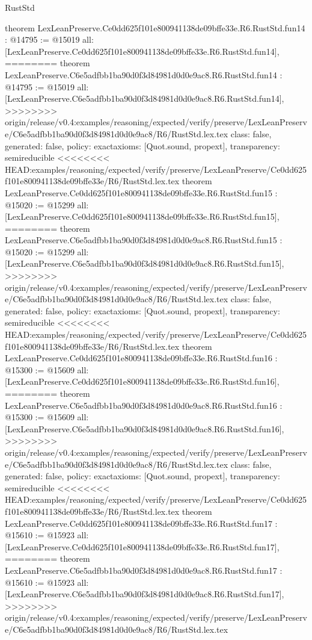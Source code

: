\begin{lexlean}{RustStd}
\begin{coremodule}
{\begin{coremodule}
{{{{{{{{{{{{{{{{theorem LexLeanPreserve.Ce0dd625f101e800941138de09bffe33e.R6.RustStd.fun14 : @14795 := @15019 {
  all: [LexLeanPreserve.Ce0dd625f101e800941138de09bffe33e.R6.RustStd.fun14],
========
theorem LexLeanPreserve.C6e5adfbb1ba90d0f3d84981d0d0e9ac8.R6.RustStd.fun14 : @14795 := @15019 {
  all: [LexLeanPreserve.C6e5adfbb1ba90d0f3d84981d0d0e9ac8.R6.RustStd.fun14],
>>>>>>>> origin/release/v0.4:examples/reasoning/expected/verify/preserve/LexLeanPreserve/C6e5adfbb1ba90d0f3d84981d0d0e9ac8/R6/RustStd.lex.tex
  class: false,
  generated: false,
  policy: exact{axioms: [Quot.sound, propext]},
  transparency: semireducible
}
<<<<<<<< HEAD:examples/reasoning/expected/verify/preserve/LexLeanPreserve/Ce0dd625f101e800941138de09bffe33e/R6/RustStd.lex.tex
theorem LexLeanPreserve.Ce0dd625f101e800941138de09bffe33e.R6.RustStd.fun15 : @15020 := @15299 {
  all: [LexLeanPreserve.Ce0dd625f101e800941138de09bffe33e.R6.RustStd.fun15],
========
theorem LexLeanPreserve.C6e5adfbb1ba90d0f3d84981d0d0e9ac8.R6.RustStd.fun15 : @15020 := @15299 {
  all: [LexLeanPreserve.C6e5adfbb1ba90d0f3d84981d0d0e9ac8.R6.RustStd.fun15],
>>>>>>>> origin/release/v0.4:examples/reasoning/expected/verify/preserve/LexLeanPreserve/C6e5adfbb1ba90d0f3d84981d0d0e9ac8/R6/RustStd.lex.tex
  class: false,
  generated: false,
  policy: exact{axioms: [Quot.sound, propext]},
  transparency: semireducible
}
<<<<<<<< HEAD:examples/reasoning/expected/verify/preserve/LexLeanPreserve/Ce0dd625f101e800941138de09bffe33e/R6/RustStd.lex.tex
theorem LexLeanPreserve.Ce0dd625f101e800941138de09bffe33e.R6.RustStd.fun16 : @15300 := @15609 {
  all: [LexLeanPreserve.Ce0dd625f101e800941138de09bffe33e.R6.RustStd.fun16],
========
theorem LexLeanPreserve.C6e5adfbb1ba90d0f3d84981d0d0e9ac8.R6.RustStd.fun16 : @15300 := @15609 {
  all: [LexLeanPreserve.C6e5adfbb1ba90d0f3d84981d0d0e9ac8.R6.RustStd.fun16],
>>>>>>>> origin/release/v0.4:examples/reasoning/expected/verify/preserve/LexLeanPreserve/C6e5adfbb1ba90d0f3d84981d0d0e9ac8/R6/RustStd.lex.tex
  class: false,
  generated: false,
  policy: exact{axioms: [Quot.sound, propext]},
  transparency: semireducible
}
<<<<<<<< HEAD:examples/reasoning/expected/verify/preserve/LexLeanPreserve/Ce0dd625f101e800941138de09bffe33e/R6/RustStd.lex.tex
theorem LexLeanPreserve.Ce0dd625f101e800941138de09bffe33e.R6.RustStd.fun17 : @15610 := @15923 {
  all: [LexLeanPreserve.Ce0dd625f101e800941138de09bffe33e.R6.RustStd.fun17],
========
theorem LexLeanPreserve.C6e5adfbb1ba90d0f3d84981d0d0e9ac8.R6.RustStd.fun17 : @15610 := @15923 {
  all: [LexLeanPreserve.C6e5adfbb1ba90d0f3d84981d0d0e9ac8.R6.RustStd.fun17],
>>>>>>>> origin/release/v0.4:examples/reasoning/expected/verify/preserve/LexLeanPreserve/C6e5adfbb1ba90d0f3d84981d0d0e9ac8/R6/RustStd.lex.tex
}}}}}}}}}}}}}}}}}}}}}
\end{coremodule}}
\end{coremodule}
\end{lexlean}
